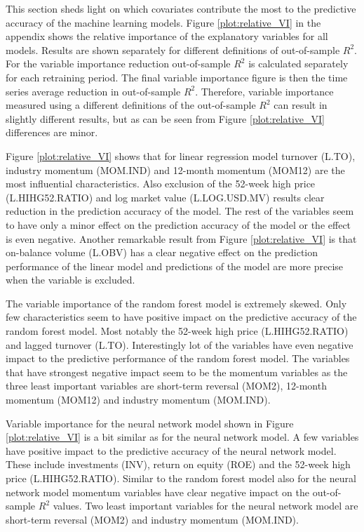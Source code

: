 \documentclass[12pt]{article}
\begin{document}
This section sheds light on which covariates contribute the most to the predictive accuracy of the machine learning models. Figure \ref{plot:relative_VI} in the appendix shows the relative importance of the explanatory variables for all models. Results are shown separately for different definitions of out-of-sample $R^2$. For the variable importance reduction out-of-sample $R^2$ is calculated separately for each retraining period. The final variable importance figure is then the time series average reduction in out-of-sample $R^2$. Therefore, variable importance measured using a different definitions of the out-of-sample $R^2$ can result in slightly different results, but as can be seen from Figure \ref{plot:relative_VI} differences are minor. \par

Figure \ref{plot:relative_VI} shows that for linear regression model turnover (L.TO), industry momentum (MOM.IND) and 12-month momentum (MOM12) are the most influential characteristics. Also exclusion of the 52-week high price (L.HIHG52.RATIO) and log market value (L.LOG.USD.MV) results clear reduction in the prediction accuracy of the model. The rest of the variables seem to have only a minor effect on the prediction accuracy of the model or the effect is even negative. Another remarkable result from Figure \ref{plot:relative_VI} is that on-balance volume (L.OBV) has a clear negative effect on the prediction performance of the linear model and predictions of the model are more precise when the variable is excluded. \par

The variable importance of the random forest model is extremely skewed. Only few characteristics seem to have positive impact on the predictive accuracy of the random forest model. Most notably the 52-week high price (L.HIHG52.RATIO) and lagged turnover (L.TO). Interestingly lot of the variables have even negative impact to the predictive performance of the random forest model. The variables that have strongest negative impact seem to be the momentum variables as the three least important variables are short-term reversal (MOM2), 12-month momentum (MOM12) and industry momentum (MOM.IND). \par

Variable importance for the neural network model shown in Figure \ref{plot:relative_VI} is a bit similar as for the neural network model. A few variables have positive impact to the predictive accuracy of the neural network model. These include investments (INV), return on equity (ROE) and the 52-week high price (L.HIHG52.RATIO). Similar to the random forest model also for the neural network model momentum variables have clear negative impact on the out-of-sample $R^2$ values. Two least important variables for the neural network model are short-term reversal (MOM2) and industry momentum (MOM.IND). \par
\end{document}
